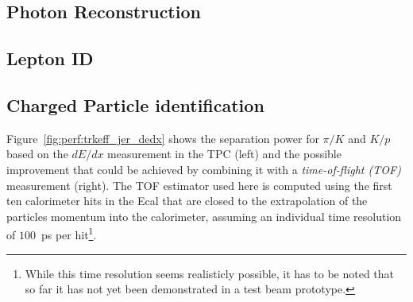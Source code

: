 \subsection{Photon Reconstruction}

\subsection{Lepton ID}


\subsection{Charged Particle identification}


Figure~\ref{fig:perf:trkeff_jer_dedx} shows the separation power for $\pi/K$ and $K/p$  based on the $dE/dx$ measurement in the TPC (left) and the
possible improvement that could be achieved by combining it with a  {\em time-of-flight (TOF)} measurement (right). The TOF estimator used here is
computed using the first ten calorimeter hits in the Ecal that are closed to the extrapolation of the particles momentum into the calorimeter, assuming
an individual time resolution of $100$~ps per hit\footnote{While this time resolution seems realisticly possible, it has to be noted that so far it has
not yet been demonstrated in a test beam prototype.}.

